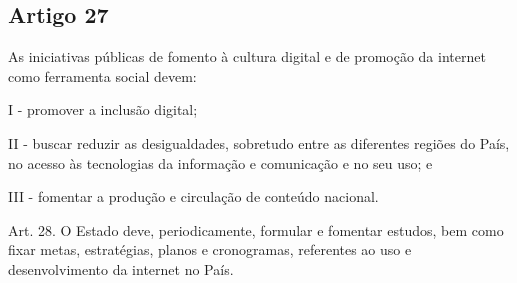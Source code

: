 \subsection{Artigo 27}
As iniciativas públicas de fomento à cultura digital e de promoção da internet como ferramenta social devem:

I - promover a inclusão digital;

II - buscar reduzir as desigualdades, sobretudo entre as diferentes regiões do País, no acesso às tecnologias da informação e comunicação e no seu uso; e

III - fomentar a produção e circulação de conteúdo nacional.

Art. 28.  O Estado deve, periodicamente, formular e fomentar estudos, bem como fixar metas, estratégias, planos e cronogramas, referentes ao uso e desenvolvimento da internet no País.